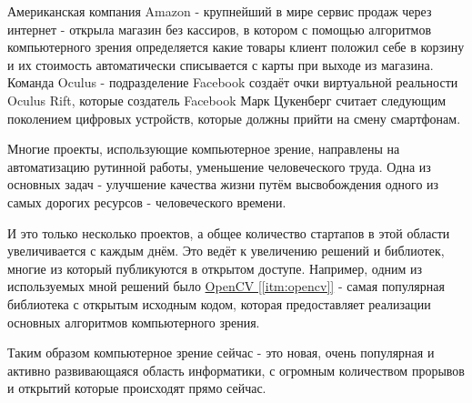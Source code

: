 Американская компания Amazon - крупнейший в мире сервис продаж через интернет - открыла магазин без кассиров, в котором с помощью алгоритмов компьютерного зрения определяется какие товары клиент положил себе в корзину и их стоимость автоматически списывается с карты при выходе из магазина. Команда Oculus - подразделение Facebook создаёт очки виртуальной реальности Oculus Rift, которые создатель Facebook Марк Цукенберг считает следующим поколением цифровых устройств, которые должны прийти на смену смартфонам.

Многие проекты, использующие компьютерное зрение, направлены на автоматизацию рутинной работы, уменьшение человеческого труда. Одна из основных задач - улучшение качества жизни путём высвобождения одного из самых дорогих ресурсов - человеческого времени.

И это только несколько проектов, а общее количество стартапов в этой области увеличивается с каждым днём. Это ведёт к увеличению решений и библиотек, многие из который публикуются в открытом доступе. Например, одним из используемых мной решений было \hyperref[itm:opencv]{OpenCV [\ref{itm:opencv}]} - самая популярная библиотека с открытым исходным кодом, которая предоставляет реализации основных алгоритмов компьютерного зрения.

Таким образом компьютерное зрение сейчас - это новая, очень популярная и активно развивающаяся область информатики, с огромным количеством прорывов и открытий которые происходят прямо сейчас.

